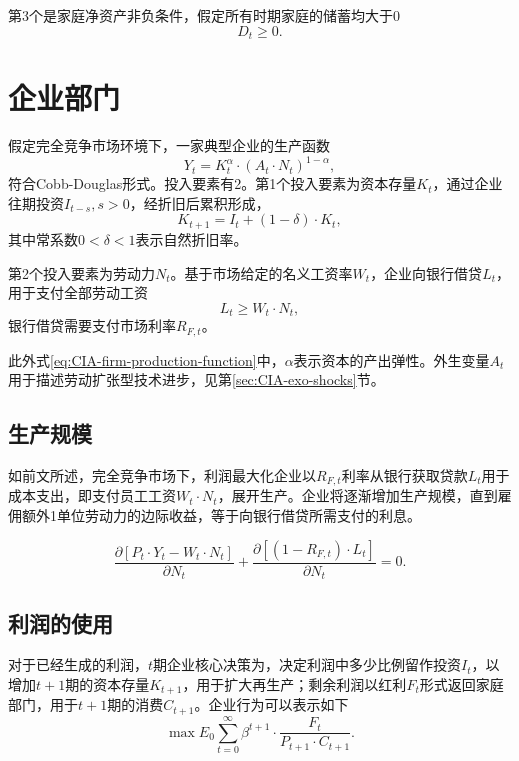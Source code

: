 第3个是家庭净资产非负条件，假定所有时期家庭的储蓄均大于$0$
\begin{equation}
  \label{eq:CIA-hh-non-negative-deposits-constraint}
  D_t \ge 0.
\end{equation}

\section{企业部门}
假定完全竞争市场环境下，一家典型企业的生产函数
\begin{equation}
  \label{eq:CIA-firm-production-function}
  Y_t = K_t^{\alpha} \cdot (A_t \cdot N_t)^{1-\alpha},
\end{equation}
符合Cobb-Douglas形式。投入要素有2。第1个投入要素为资本存量$K_t$，通过企业往期投资$I_{t-s}, s>0$，经折旧后累积形成，
\begin{equation}
  \label{eq:CIA-firm-capital-accumulation}
  K_{t+1} = I_{t} + (1-\delta) \cdot K_t,
\end{equation}
其中常系数$0<\delta<1$表示自然折旧率。

第2个投入要素为劳动力$N_t$。基于市场给定的名义工资率$W_t$，企业向银行借贷$L_t$，用于支付全部劳动工资
\begin{equation}
  \label{eq:CIA-firm-lending-balance}
  L_t \ge W_t \cdot N_t,
\end{equation}
银行借贷需要支付市场利率$R_{F,t}$。

此外式\eqref{eq:CIA-firm-production-function}中，$\alpha$表示资本的产出弹性。外生变量$A_t$用于描述劳动扩张型技术进步，见第\ref{sec:CIA-exo-shocks}节。

\subsection{生产规模}
如前文所述，完全竞争市场下，利润最大化企业以$R_{F,t}$利率从银行获取贷款$L_t$用于成本支出，即支付员工工资$W_t \cdot N_t$，展开生产。企业将逐渐增加生产规模，直到雇佣额外1单位劳动力的边际收益，等于向银行借贷所需支付的利息。

\begin{equation}
  \label{CIA-firm-optim-partial}
  \frac{\partial \left[ P_t \cdot Y_t - W_t \cdot N_t \right]}{\partial N_t} + \frac{\partial \left[ (1-R_{F,t}) \cdot L_t \right]}{\partial N_t} = 0.
\end{equation}


\subsection{利润的使用}
对于已经生成的利润，$t$期企业核心决策为，决定利润中多少比例留作投资$I_t$，以增加$t+1$期的资本存量$K_{t+1}$，用于扩大再生产；剩余利润以红利$F_t$形式返回家庭部门，用于$t+1$期的消费$C_{t+1}$。企业行为可以表示如下
\begin{equation}
  \label{CIA-firm-max-problem}
  \max E_0 \sum_{t=0}^{\infty} \beta^{t+1} \cdot \frac{F_t}{P_{t+1} \cdot C_{t+1}}.
\end{equation}

